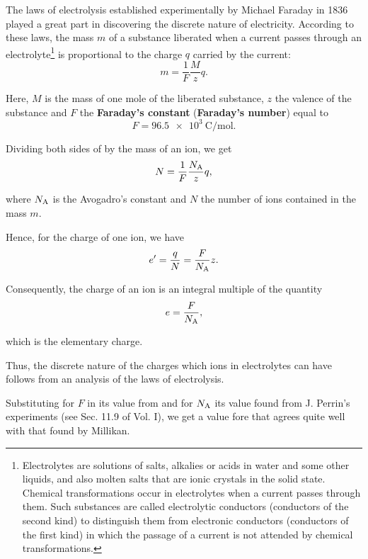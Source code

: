 The laws of electrolysis established experimentally by Michael Faraday in 1836 played a great part in discovering the discrete nature of electricity.
According to these laws, the mass $m$ of a substance
liberated when a current passes through an electrolyte\footnote{Electrolytes are solutions of salts, alkalies or acids in water and some other
liquids, and also molten salts that are ionic crystals in the solid state. Chemical transformations occur in electrolytes when a current passes through them. Such substances are called electrolytic conductors (conductors of the second kind) to distinguish them from electronic conductors (conductors of the first kind) in which the passage of a current is not attended by chemical transformations.} is proportional to the charge $q$ carried by the current:
\begin{equation}\label{eq:10_25}
    m = \frac{1}{F} \frac{M}{z} q.
\end{equation}

\noindent
Here, $M$ is the mass of one mole of the liberated substance, $z$ the valence of the substance and $F$ the \textbf{Faraday's constant} (\textbf{Faraday's number}) equal to
\begin{equation}\label{eq:10_26}
    F = \SI{96.5e3}{\coulomb\per\mole}.
\end{equation}

Dividing both sides of  by the mass of an ion, we get
\begin{equation*}
    N = \frac{1}{F} \frac{N_{\text{A}}}{z} q,
\end{equation*}

\noindent
where $N_{\text{A}}$ is the Avogadro's constant and $N$ the number of ions contained in the mass $m$.

Hence, for the charge of one ion, we have
\begin{equation*}
    e' = \frac{q}{N} = \frac{F}{N_{\text{A}}} z.
\end{equation*}

\noindent
Consequently, the charge of an ion is an integral multiple of the quantity
\begin{equation}\label{eq:10_27}
    e = \frac{F}{N_{\text{A}}},
\end{equation}

\noindent
which is the elementary charge.

Thus, the discrete nature of the charges which ions in electrolytes can have follows from an analysis of the laws of electrolysis.

Substituting for $F$ in  its value from  and for $N_{\text{A}}$ its value found from J. Perrin's experiments (see Sec. 11.9 of Vol. I), we get a value fore that agrees quite well with that
found by Millikan.

